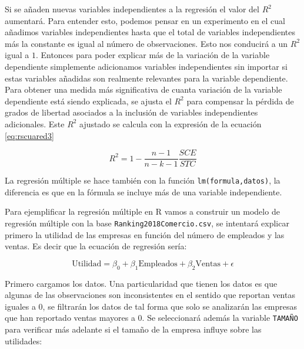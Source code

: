 \documentclass[letterpaper,]{book}
\newenvironment{Shaded}{\begin{snugshade}}{\end{snugshade}}
\newcommand{\DataTypeTok}[1]{\textcolor[rgb]{0.13,0.29,0.53}{#1}}
\newcommand{\DecValTok}[1]{\textcolor[rgb]{0.00,0.00,0.81}{#1}}
\newcommand{\KeywordTok}[1]{\textcolor[rgb]{0.13,0.29,0.53}{\textbf{#1}}}
\newcommand{\NormalTok}[1]{#1}
\newcommand{\OperatorTok}[1]{\textcolor[rgb]{0.81,0.36,0.00}{\textbf{#1}}}
\newcommand{\OtherTok}[1]{\textcolor[rgb]{0.56,0.35,0.01}{#1}}
\newcommand{\StringTok}[1]{\textcolor[rgb]{0.31,0.60,0.02}{#1}}
\begin{document}
Si se añaden nuevas variables independientes a la regresión el valor del \(R^2\) aumentará. Para entender esto, podemos pensar en un experimento en el cual añadimos variables independientes hasta que el total de variables independientes más la constante es igual al número de observaciones. Esto nos conducirá a un \(R^2\) igual a \(1\). Entonces para poder explicar más de la variación de la variable dependiente simplemente adicionamos variables independientes sin importar si estas variables añadidas son realmente relevantes para la variable dependiente. Para obtener una medida más significativa de cuanta variación de la variable dependiente está siendo explicada, se ajusta el \(R^2\) para compensar la pérdida de grados de libertad asociados a la inclusión de variables independientes adicionales. Este \(R^2\) ajustado se calcula con la expresión de la ecuación \eqref{eq:rscuared3}

\begin{equation}
R^2 = 1 -\dfrac{n-1}{n-k-1} \dfrac{SCE}{STC}
    \label{eq:rscuared3}
\end{equation}

La regresión múltiple se hace también con la función \texttt{lm(formula,datos)}, la diferencia es que en la fórmula se incluye más de una variable independiente.

Para ejemplificar la regresión múltiple en R vamos a construir un modelo de regresión múltiple con la base \texttt{Ranking2018Comercio.csv}, se intentará explicar primero la utilidad de las empresas en función del número de empleados y las ventas. Es decir que la ecuación de regresión sería:

\begin{equation}
  \text{Utilidad} = \beta_0 + \beta_1 \text{Empleados} + \beta_2 \text{Ventas} + \epsilon
    \label{eq:modelo2}
\end{equation}

Primero cargamos los datos. Una particularidad que tienen los datos es que algunas de las observaciones son inconsistentes en el sentido que reportan ventas iguales a 0, se filtrarán los datos de tal forma que solo se analizarán las empresas que han reportado ventas mayores a 0. Se seleccionará además la variable \texttt{TAMAÑO} para verificar más adelante si el tamaño de la empresa influye sobre las utilidades:

\begin{Shaded}
\end{Shaded}
\end{document}
